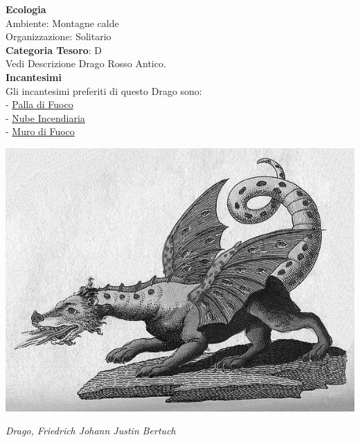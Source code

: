 \begin{multicols}{2}
{\textbf{Ecologia}\\
Ambiente: Montagne calde\\
Organizzazione: Solitario\\
\textbf{Categoria Tesoro}: D\\
Vedi Descrizione Drago Rosso Antico.\\
\textbf{Incantesimi}\\
Gli incantesimi preferiti di questo Drago sono:\\
- \hyperlink{Palla di Fuoco}{Palla di Fuoco}\\
- \hyperlink{Nube Incendiaria}{Nube Incendiaria}\\
- \hyperlink{Muro di Fuoco}{Muro di Fuoco}


\medskip

\begin{center}
	\includegraphics[width=0.9\linewidth]{immagini/Friedrich-Johann-Justin-Bertuch_Mythical-Creature-Dragon_1806.png}

	\emph{Drago, Friedrich Johann Justin Bertuch}
\end{center}

}
\end{multicols}
